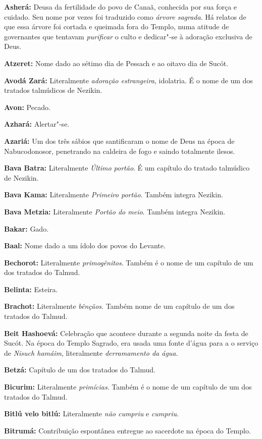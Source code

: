 \begin{hangparas}{.25in}{1}
{\textbf{Asherá:} Deusa da fertilidade do povo de Canaã, conhecida por sua força e cuidado. Seu nome por vezes foi traduzido como \emph{árvore sagrada}. Há relatos de que essa árvore foi cortada e queimada fora do Templo, numa atitude de governantes que tentavam \emph{purificar} o culto e dedicar"-se à adoração exclusiva de Deus.

\textbf{Atzeret:} Nome dado ao sétimo dia de Pessach e ao oitavo dia de Sucót.

\textbf{Avodá Zará:} Literalmente \emph{adoração estrangeira}, idolatria. 
É o nome de um dos tratados talmúdicos de Nezikin.

\textbf{Avon:} Pecado.

\textbf{Azhará:} Alertar"-se.

\textbf{Azariá:} Um dos três sábios que santificaram o nome de Deus na
época de Nabucodonosor, penetrando na caldeira de fogo e saindo
totalmente ilesos.

\textbf{Bava Batra:} Literalmente \emph{Último portão}. É um capítulo do tratado talmúdico de Nezikin.

\textbf{Bava Kama:} Literalmente \emph{Primeiro portão}. Também integra Nezikin.

\textbf{Bava Metzia:} Literalmente \emph{Portão do meio}. Também integra Nezikin.

\textbf{Bakar:} Gado.

\textbf{Baal:} Nome dado a um ídolo dos povos do Levante.

\textbf{Bechorot:} Literalmente \emph{primogênitos}. Também é o nome de um capítulo de um dos tratados do Talmud.

\textbf{Belinta:} Esteira.

\textbf{Brachot:} Literalmente \emph{bênçãos}. Também nome de um capítulo de um dos
tratados do Talmud.

\textbf{Beit Hashoevá:} Celebração que acontece durante a segunda noite da festa de Sucót. Na época do Templo Sagrado, era usada uma fonte d'água para a o serviço de \emph{Nisuch hamáim}, literalmente \emph{derramamento da água}.

\textbf{Betzá:} Capítulo de um dos tratados do Talmud.

\textbf{Bicurim:} Literalmente \emph{primícias}. Também é o nome de um capítulo de um dos tratados do Talmud.

\textbf{Bitlú velo bitlú:} Literalmente \emph{não cumpriu} e \emph{cumpriu}.

\textbf{Bitrumá:} Contribuição espontânea entregue ao sacerdote na
época do Templo.

}
\end{hangparas}
